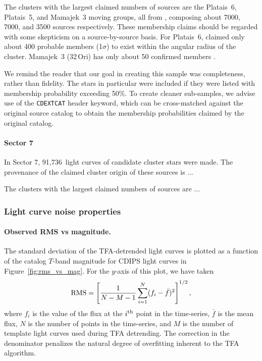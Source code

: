 \documentclass[12pt,twocolumn,tighten]{aastex62}
\newcommand{\sVIInumberlcs}{91{,}736\ }  %
\begin{document}
The clusters with the largest claimed numbers of sources are the
Platais~6, Platais~5, and Mamajek~3 moving groups, all from
\citet{dias_proper_2014}, composing about 7000, 7000, and 3500 sources
respectively. These membership claims should be regarded with some
skepticism on a source-by-source basis.  For Platais~6,
\citet{Kharchenko_et_al_2013} claimed only about 400 probable members
(1$\sigma$) to exist within the angular radius of the cluster.
Mamajek~3 (32$\,$Ori) has only about 50 confirmed members
\citep{bell_32ori_2017}.

We remind the reader that our goal in creating this sample was
completeness, rather than fidelity. The \citet{dias_proper_2014} stars
in particular were included if they were listed with membership
probability exceeding 50\%.  To create cleaner sub-samples, we advise
use of the \texttt{CDEXTCAT} header keyword, which can be
cross-matched against the original source catalog to obtain the
membership probabilities claimed by the original catalog.

\paragraph{Sector 7}
In Sector 7, \sVIInumberlcs light curves of candidate cluster stars
were made. The provenance of the claimed cluster origin of these
sources is  ...

The clusters with the largest claimed numbers of sources are ...


\subsubsection{Light curve noise properties}
\label{subsubsec:rmsvsmag}

\paragraph{Observed RMS vs magnitude.}
The standard deviation of the TFA-detrended light curves is plotted as
a function of the catalog $T$-band magnitude for CDIPS light curves in
Figure~\ref{fig:rms_vs_mag}.
For the $y$-axis of this plot, we have taken
\begin{equation}
  {\rm RMS} = \left[
    \frac{1}{N-M-1}
    \sum_{i=1}^{N} (f_i - \bar{f})^2
  \right]^{1/2},
\end{equation}
where $f_i$ is the value of the flux at the $i^{\rm th}$ point in the
time-series, $\bar{f}$ is the mean flux, $N$ is the
number of points in the time-series, and $M$ is the number
of template light curves used during TFA detrending.
The correction in the denominator penalizes the natural degree of
overfitting inherent to the TFA algorithm.
\end{document}
